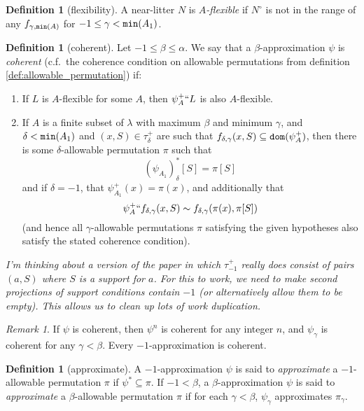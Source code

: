 \documentclass[112pt]{article}
\theoremstyle{definition}
\newtheorem{definition}[theorem]{Definition}
\theoremstyle{remark}
\newtheorem{remark}[theorem]{Remark}
\newenvironment{annot}{\begin{center}\color{blue}\sl}{\end{center}}
\begin{document}
\begin{definition}[flexibility]\label{def:flexible}
  A near-litter $N$ is {\em  $A$-flexible\/} if $N^\circ$ is not in the range of any $f_{\gamma,{\tt min}(A)}$
for $-1 \leq \gamma<{\tt min}(A_1)$.
\end{definition}
\begin{definition}[coherent]\label{def:coherent}
  Let $-1 \leq \beta \leq \alpha$.
  We say that a $\beta$-approximation $\psi$ is {\em coherent\/} (c.f.\ the coherence condition on allowable permutations from definition \ref{def:allowable_permutation}) if:
  \begin{enumerate}
    \item If $L$ is $A$-flexible for some $A$, then $\psi_A^+ `` L$ is also $A$-flexible.
    \item If $A$ is a finite subset of $\lambda$ with maximum $\beta$ and minimum $\gamma$, and $\delta < {\tt min}(A_1)$ and $(x, S) \in \tau_\delta^+$ are such that $f_{\delta,\gamma}(x, S) \subseteq {\tt dom}(\psi_A^+)$, then there is some $\delta$-allowable permutation $\pi$ such that
    $$ (\psi_{A_1})_\delta^*[S] = \pi[S] $$
    and if $\delta = -1$, that $\psi_{A_1}^+(x) = \pi(x)$, and additionally that
    $$ \psi_A^+ `` f_{\delta,\gamma}(x, S) \sim f_{\delta,\gamma}(\pi(x), \pi[S]) $$
    (and hence all $\gamma$-allowable permutations $\pi$ satisfying the given hypotheses also satisfy the stated coherence condition).
  \end{enumerate}
\end{definition}
\begin{annot}
  I'm thinking about a version of the paper in which $\tau_{-1}^+$ really does consist of pairs $(a, S)$ where $S$ is a support for $a$.
  For this to work, we need to make second projections of support conditions contain $-1$ (or alternatively allow them to be empty).
  This allows us to clean up lots of work duplication.
\end{annot}
\begin{remark}\label{rk:power_deriv_coherent}
  If $\psi$ is coherent, then $\psi^n$ is coherent for any integer $n$, and $\psi_\gamma$ is coherent for any $\gamma < \beta$.
  Every $-1$-approximation is coherent.
\end{remark}
\begin{definition}[approximate]
  A $-1$-approximation $\psi$ is said to {\em approximate\/} a $-1$-allowable permutation $\pi$ if $\psi^* \subseteq \pi$.
  If $-1 < \beta$, a $\beta$-approximation $\psi$ is said to {\em approximate\/} a $\beta$-allowable permutation $\pi$ if for each $\gamma < \beta$, $\psi_\gamma$ approximates $\pi_\gamma$.
\end{definition}
\end{document}
